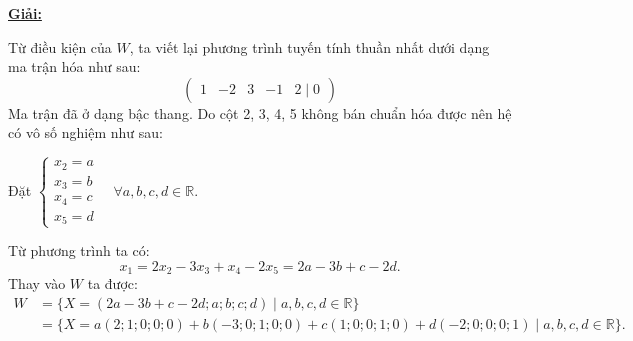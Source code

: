 \documentclass[12pt,a4paper]{article}
\newcommand{\R}{\mathbb{R}}
\begin{document}
\underline{\textbf{Giải:}}

Từ điều kiện của $W$, ta viết lại phương trình tuyến tính thuần nhất dưới dạng ma trận hóa như sau:
\[
\begin{pmatrix} 1 & -2 & 3 & -1 & 2 \mid 0 \end{pmatrix}
\]
Ma trận đã ở dạng bậc thang. Do cột 2, 3, 4, 5 không bán chuẩn hóa được nên hệ có vô số nghiệm như sau:

Đặt $\begin{cases} x_2 = a \\ x_3 = b \\ x_4 = c \\ x_5 = d \end{cases} \quad \forall a, b, c, d \in \R$.

Từ phương trình ta có:
\[
x_1 = 2x_2 - 3x_3 + x_4 - 2x_5 = 2a - 3b + c - 2d.
\]
Thay vào $W$ ta được:
\begin{align*}
W &= \{ X = (2a - 3b + c - 2d; a; b; c; d) \mid a, b, c, d \in \R \} \\
  &= \{ X = a(2; 1; 0; 0; 0) + b(-3; 0; 1; 0; 0) + c(1; 0; 0; 1; 0) + d(-2; 0; 0; 0; 1) \mid a, b, c, d \in \R \}.
\end{align*}
\end{document}
